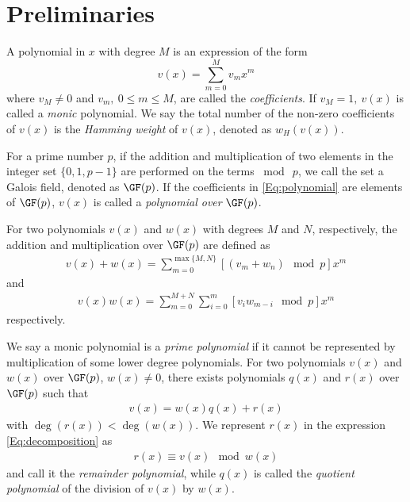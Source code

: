 \section{Preliminaries}
\label{secPrelim}

A polynomial in $x$ with degree $M$ is an expression of the form
\begin{equation}
v(x) = \sum_{m=0}^{M} v_mx^m
\label{Eq:polynomial}
\end{equation}
where $v_M \neq 0$ and $v_m,~0 \leq m \leq M$, are called the \textit{coefficients}. If $v_M=1,~v(x)$ is called a \textit{monic} polynomial. We say the total number of the non-zero coefficients of $v(x)$ is the \textit{Hamming weight} of $v(x)$, denoted as $w_H(v(x))$.

For a prime number $p$, if the addition and multiplication of two elements in the integer set $\{ 0,1,p-1\}$ are performed on the terms $\bmod~p$, we call the set a Galois field, denoted as $\GF(p)$. If the coefficients in \eqref{Eq:polynomial} are elements of $\GF(p)$, $v(x)$ is called a {\it polynomial over} $\GF(p)$.


For two polynomials $v(x)$ and $w(x)$ with degrees $M$ and $N$, respectively, the addition and multiplication over $\GF(p)$ are defined as 
\begin{align}
v(x)+w(x)=\sum_{m=0}^{\max\{ M,N\}} [(v_m +w_n)\mod p] x^m
\label{Eq:addition}
\end{align}
and
\begin{align}
v(x)w(x)=\sum_{m=0}^{ M+N} \sum_{i=0}^{m} [v_i w_{m-i}\mod p]x^m
\label{Eq:multiplication}
\end{align}
respectively. 

We say a monic polynomial is a \textit{prime polynomial} if it cannot be represented by multiplication of some lower degree polynomials.
For two polynomials $v(x)$ and $w(x)$ over $\GF(p)$, $w(x) \neq 0$, there exists polynomials $q(x)$ and $r(x)$ 
over $\GF(p)$ such that 
\begin{align}
v(x) = w(x)q(x)+r(x)
\label{Eq:decomposition}
\end{align}
with $\deg(r(x)) < \deg(w(x))$. We represent $r(x)$ in the expression \eqref{Eq:decomposition} as
\begin{align}
r(x) \equiv v(x)\mod w(x)
\end{align}
and call it the \textit{remainder polynomial}, while $q(x)$ is called the \textit{quotient polynomial} of the division of $v(x)$ by $w(x)$.

